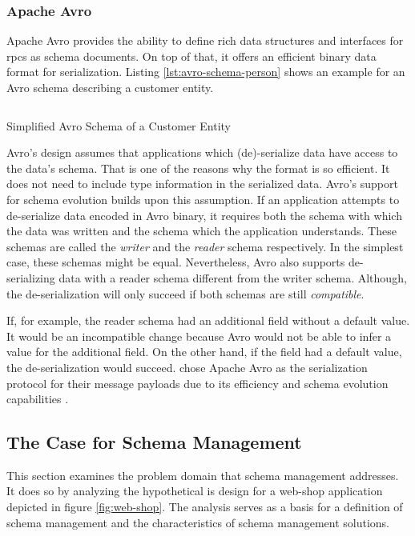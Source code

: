 \subsubsection{Apache Avro}\label{sec:avro}

Apache Avro provides the ability to define rich data structures and interfaces for \glspl{rpc} as schema documents.
On top of that, it offers an efficient binary data format for serialization.
Listing \ref{lst:avro-schema-person} shows an example for an Avro schema describing a customer entity.
\parencite{apache_software_foundation_apache_2021}

\begin{listing}[H]
  \inputminted{json}{assets/src/Customer.avsc}
  \caption{Simplified Avro Schema of a Customer Entity}\label{lst:avro-schema-person}
\end{listing}

Avro's design assumes that applications which (de)-serialize data have access to the data's schema.
That is one of the reasons why the format is so efficient.
It does not need to include type information in the serialized data.
Avro's support for schema evolution builds upon this assumption.
If an application attempts to de-serialize data encoded in Avro binary, it requires both the schema with which the data was written and the schema which the application understands.
These schemas are called the \emph{writer} and the \emph{reader} schema respectively.
In the simplest case, these schemas might be equal.
Nevertheless, Avro also supports de-serializing data with a reader schema different from the writer schema.
Although, the de-serialization will only succeed if both schemas are still \emph{compatible}.
\parencite{apache_software_foundation_apache_2021}

If, for example, the reader schema had an additional field without a default value.
It would be an incompatible change because Avro would not be able to infer a value for the additional field.
On the other hand, if the field had a default value, the de-serialization would succeed.
\citeauthor{kreps_kafka_2011} chose Apache Avro as the serialization protocol for their message payloads due to its efficiency and schema evolution capabilities \parencite{kreps_kafka_2011}. 

\subsection{The Case for Schema Management}

This section examines the problem domain that schema management addresses.
It does so by analyzing the hypothetical \gls{is} design for a web-shop application depicted in figure \ref{fig:web-shop}.
The analysis serves as a basis for a definition of schema management and the characteristics of schema management solutions.

